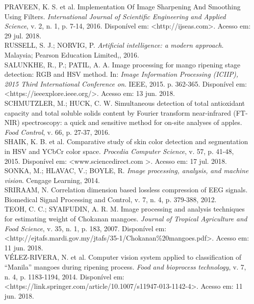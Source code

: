 \noindent PRAVEEN, K. S. et al. Implementation Of Image Sharpening And Smoothing Using Filters. \textit{International Journal of Scientific Engineering and Applied Science}, v. 2, n. 1, p. 7-14, 2016. Disponível em: <http://ijseas.com>. Acesso em: 29 jul. 2018.
\\

\noindent RUSSELL, S. J.; NORVIG, P. \textit{Artificial intelligence: a modern approach}. Malaysia; Pearson Education Limited,, 2016.
\\

\noindent SALUNKHE, R., P.; PATIL, A. A. Image processing for mango ripening stage detection: RGB and HSV method. In: \textit{Image Information Processing (ICIIP), 2015 Third International Conference on}. IEEE, 2015. p. 362-365. Disponível em: <https://ieeexplore.ieee.org/>. Acesso em: 13 jun. 2018.
\\

\noindent SCHMUTZLER, M.; HUCK, C. W. Simultaneous detection of total antioxidant capacity and total soluble solids content by Fourier transform near-infrared (FT-NIR) spectroscopy: a quick and sensitive method for on-site analyses of apples. \textit{Food Control}, v. 66, p. 27-37, 2016.
\\

\noindent SHAIK, K. B. et al. Comparative study of skin color detection and segmentation in HSV and YCbCr color space. \textit{Procedia Computer Science}, v. 57, p. 41-48, 2015. Disponível em: <www.sciencedirect.com >. Acesso em: 17 jul. 2018.
\\

\noindent SONKA, M.; HLAVAC, V.; BOYLE, R. \textit{Image processing, analysis, and machine vision}. Cengage Learning, 2014.
\\

\noindent SRIRAAM, N. Correlation dimension based lossless compression of EEG signals. Biomedical Signal Processing and Control, v. 7, n. 4, p. 379-388, 2012.
\\

\noindent TEOH, C. C.; SYAIFUDIN, A. R. M. Image processing and analysis techniques for estimating weight of Chokanan mangoes. \textit{Journal of Tropical Agriculture and Food Science}, v. 35, n. 1, p. 183, 2007. Disponível em: <http://ejtafs.mardi.gov.my/jtafs/35-1/Chokanan\%20mangoes.pdf>. Acesso em: 11 jun. 2018.
\\

\noindent VÉLEZ-RIVERA, N. et al. Computer vision system applied to classification of “Manila” mangoes during ripening process. \textit{Food and bioprocess technology}, v. 7, n. 4, p. 1183-1194, 2014. Disponível em: <https://link.springer.com/article/10.1007/s11947-013-1142-4>. Acesso em: 11 jun. 2018.
\\

